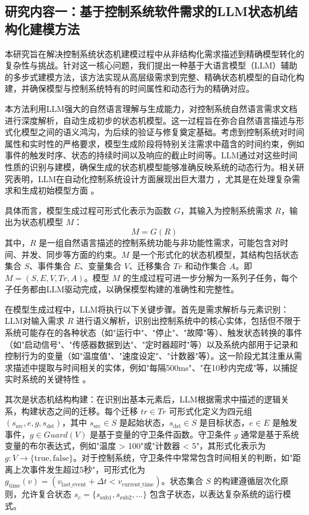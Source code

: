 \subsection{研究内容一：基于控制系统软件需求的LLM状态机结构化建模方法}
\label{section-tech-generation}

本研究旨在解决控制系统状态机建模过程中从非结构化需求描述到精确模型转化的复杂性与挑战。针对这一核心问题，我们提出一种基于大语言模型（LLM）辅助的多步式建模方法，该方法实现从高层级需求到完整、精确状态机模型的自动化构建，并确保模型与控制系统特有的时间属性和动态行为的精确对应。

本方法利用LLM强大的自然语言理解与生成能力，对控制系统自然语言需求文档进行深度解析，自动生成初步的状态机模型。这一过程旨在弥合自然语言描述与形式化模型之间的语义鸿沟，为后续的验证与修复奠定基础。考虑到控制系统对时间属性和实时性的严格要求，模型生成阶段将特别关注需求中蕴含的时间约束，例如事件的触发时序、状态的持续时间以及响应的截止时间等。LLM通过对这些时间性质的识别与建模，确保生成的状态机模型能够准确反映系统的动态行为。相关研究表明，LLM在自动化控制系统设计方面展现出巨大潜力 ，尤其是在处理复杂需求和生成初始模型方面 。

具体而言，模型生成过程可形式化表示为函数 $G$，其输入为控制系统需求 $R$，输出为状态机模型 $M$：
\begin{equation}
M = G(R)
\label{eq:model_generation}
\end{equation}
其中，$R$ 是一组自然语言描述的控制系统功能与非功能性需求，可能包含对时间、并发、同步等方面的约束。$M$ 是一个形式化的状态机模型，其结构包括状态集合 $S$、事件集合 $E$、变量集合 $V$、迁移集合 $Tr$ 和动作集合 $A$。即 $M = (S, E, V, Tr, A)$。模型 $M$ 的生成过程可进一步分解为一系列子任务，每个子任务都由LLM驱动完成，以确保模型构建的准确性和完整性。

在模型生成过程中，LLM将执行以下关键步骤。首先是需求解析与元素识别：LLM对输入需求 $R$ 进行语义解析，识别出控制系统中的核心实体，包括但不限于系统可能存在的各种状态（如"运行中"、"停止"、"故障"等）、触发状态转换的事件（如"启动信号"、"传感器数据到达"、"定时器超时"等）以及系统内部用于记录和控制行为的变量（如"温度值"、"速度设定"、"计数器"等）。这一阶段尤其注重从需求描述中提取与时间相关的实体，例如"每隔500ms"、"在10秒内完成"等，以捕捉实时系统的关键特性 。

其次是状态机结构构建：在识别出基本元素后，LLM根据需求中描述的逻辑关系，构建状态之间的迁移。每个迁移 $tr \in Tr$ 可形式化定义为四元组 $(s_\text{src}, e, g, s_\text{dst})$，其中 $s_\text{src} \in S$ 是起始状态，$s_\text{dst} \in S$ 是目标状态，$e \in E$ 是触发事件，$g \in Guard(V)$ 是基于变量的守卫条件函数。守卫条件 $g$ 通常是基于系统变量的布尔表达式，例如"温度 > 100"或"计数器 < 5"，其形式化表示为 $g: V \rightarrow \{\text{true}, \text{false}\}$。对于控制系统，守卫条件中常常包含时间相关的判断，如"距离上次事件发生超过5秒"，可形式化为 $g_{\text{time}}(v) = (v_{\text{last\_event}} + \Delta t < v_{\text{current\_time}})$。状态集合 $S$ 的构建遵循层次化原则，允许复合状态 $s_c = \{s_\text{sub1}, s_\text{sub2}, \dots\}$ 包含子状态，以表达复杂系统的运行模式。

